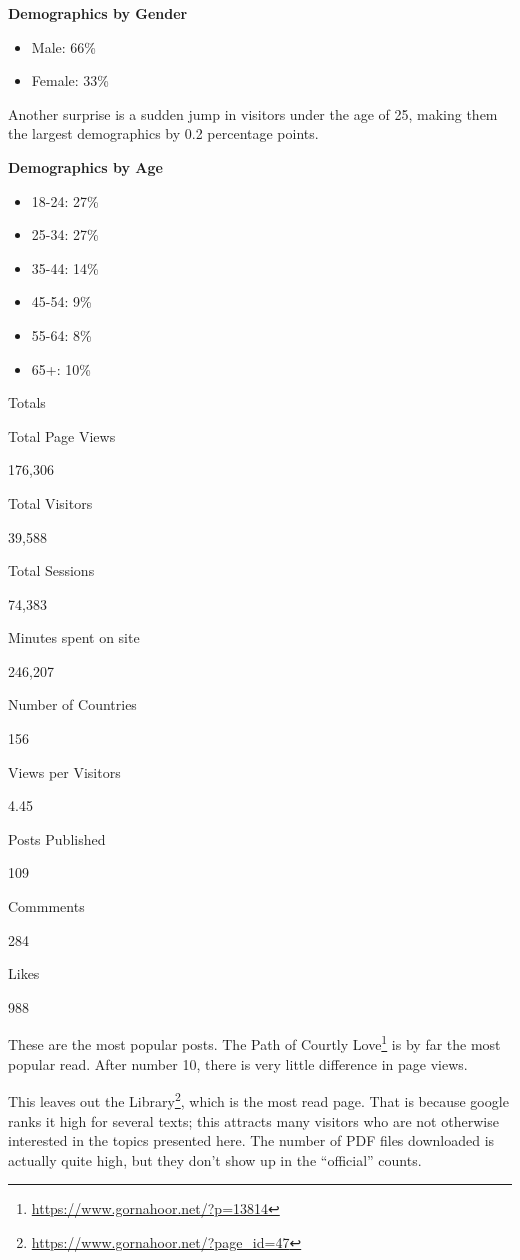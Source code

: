 \textbf{Demographics by Gender}
\begin{itemize}
\item Male: 66\% 
\item Female: 33\%
\end{itemize}


Another surprise is a sudden jump in visitors under the age of 25, making them the largest demographics by 0.2 percentage points.

\textbf{Demographics by Age}
\begin{itemize}
\item 18-24: 27\% 
\item 25-34: 27\% 
\item 35-44: 14\% 
\item 45-54: 9\% 
\item 55-64: 8\% 
\item 65+: 10\%
\end{itemize}


Totals

Total Page Views

176,306

Total Visitors

39,588

Total Sessions

74,383

Minutes spent on site

246,207

Number of Countries

156

Views per Visitors

4.45

Posts Published

109

Commments

284

Likes

988

These are the most popular posts. The Path of Courtly Love\footnote{\url{https://www.gornahoor.net/?p=13814}} is by far the most popular read. After number 10, there is very little difference in page views.

This leaves out the Library\footnote{\url{https://www.gornahoor.net/?page\_id=47}}, which is the most read page. That is because google ranks it high for several texts; this attracts many visitors who are not otherwise interested in the topics presented here. The number of PDF files downloaded is actually quite high, but they don't show up in the ``official'' counts.

